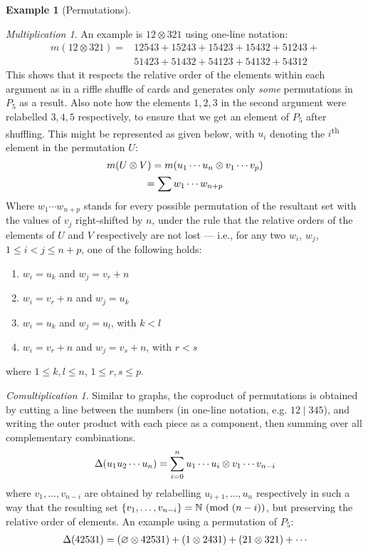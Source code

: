 \documentclass[svgnames]{article}
\theoremstyle{definition}
\newtheorem{Example}{Example}
\theoremstyle{remark}
\theoremstyle{underline}
\newtheorem*{Multiplication*}{Multiplication}
\theoremstyle{underline}
\newtheorem*{Comultiplication*}{Comultiplication}
\newcommand{\Mod}[1]{\ (\mathrm{mod}\ #1)}
\renewcommand{\th}{\textsuperscript{th}\xspace}
\begin{document}
\begin{Example}[Permutations]
		\begin{Multiplication*}
			An example is $12 \otimes 321$ using one-line notation:
			\begin{align*}
			m(12 \otimes 321) = & 12543 + 15243 + 15423 + 15432 + 51243 + {}\\
				& 51423 +  51432 + 54123 + 54132 + 54312
			\end{align*}
			This shows that it respects the relative order of the elements within each argument as in a riffle shuffle of cards and generates only \emph{some} permutations in $P_5$ as a result. Also note how the elements $1, 2, 3$ in the second argument were relabelled $3, 4, 5$ respectively, to ensure that we get an element of $P_5$ after shuffling. This might be represented as given below, with $u_i$ denoting the $i$\th element in the permutation $U$:
			\begin{gather*}
			m\pqty{U \otimes V} = m\pqty{u_1 \cdots u_n \otimes v_1 \cdots v_p} \\
			= \sum w_1 \cdots w_{n + p}
			\end{gather*}
			Where $w_1 \cdots w_{n + p}$ stands for every possible permutation of the resultant set with the values of $v_j$ right-shifted by $n$, under the rule that the relative orders of the elements of $U$ and $V$ respectively are not lost --- i.e., for any two $w_i$, $w_j$, $1 \le i < j \le n + p$, one of the following holds:
			\begin{enumerate}
				\item $w_i = u_k$ and $w_j = v_r + n$ 
				\item $w_i = v_r + n$ and $w_j = u_k$
				\item $w_i = u_k$ and $w_j = u_l$, with $k < l$
				\item $w_i = v_r + n$ and $w_j = v_s + n$, with $r < s$
			\end{enumerate}
			where $1 \le k, l \le n$, $1 \le r, s \le p$.
		\end{Multiplication*}
		
		\begin{Comultiplication*}
			Similar to graphs, the coproduct of permutations is obtained by cutting a line between the numbers (in one-line notation, e.g. $12 \mid 345$), and writing the outer product with each piece as a component, then summing over all complementary combinations. 
			\begin{gather*}
			\Delta\pqty{u_1 u_2 \cdots u_n} = \sum_{i=0}^n u_1 \cdots u_i \otimes v_1 \cdots v_{n - i}
			\end{gather*}
			where $v_1, \ldots, v_{n - i}$ are obtained by relabelling $u_{i + 1}, \ldots, u_n$ respectively in such a way that the resulting set $\qty{v_1, \ldots, v_{n - i}} = \mathbb N \Mod {(n - i)}$, but preserving the relative order of elements. An example using a permutation of $P_5$:
			\begin{gather*}
			\Delta\pqty{42531} = \pqty{\varnothing \otimes 42531} + \pqty{1 \otimes 2431} + \pqty{21 \otimes 321} + \cdots
			\end{gather*}
		\end{Comultiplication*}
		

\end{Example}
\end{document}
